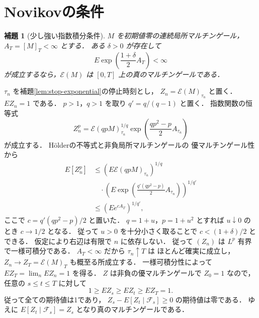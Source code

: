 \documentclass[a5paper,10pt,onecolumn]{jsarticle}
\makeatletter
\theoremstyle{mathnotetheorem}
\newtheorem{lemma}[theorem]{補題}
\renewcommand{\proofname}{証明}
\renewenvironment{proof}[1][\proofname]{%
  \par\pushQED{\qed}\normalfont\topsep4\p@\@plus2\p@\relax
  \trivlist\item[\hskip\labelsep\bfseries #1]\ignorespaces
}{\popQED\endtrivlist\@endpefalse}
\makeatother
\begin{document}
\section{Novikovの条件}

\begin{lemma}[少し強い指数積分条件]\label{lem:strong-nov}
$M$ を初期値零の連続局所マルチンゲール，
$A_T=[M]_T<\infty$ とする．
ある $\delta>0$ が存在して
\[
 E\exp\!\left(\frac{1+\delta}{2}A_T\right)<\infty
\]
が成立するなら，$\mathcal E(M)$ は
$[0,T]$ 上の真のマルチンゲールである．
\end{lemma}
\begin{proof}
$\tau_n$ を補題\ref{lem:stop-exponential}の停止時刻とし，
$Z_n=\mathcal E(M)_{\tau_n}$ と置く．
$EZ_n=1$ である．
$p>1$，$q>1$ を取り $q'=q/(q-1)$ と置く．
指数関数の恒等式
\[
 Z_n^p
 =\mathcal E(qpM)_{\tau_n}^{1/q}
  \exp\!\left(\frac{qp^2-p}{2}A_{\tau_n}\right)
\]
が成立する．
H\"olderの不等式と非負局所マルチンゲールの
優マルチンゲール性から
\begin{align*}
 E[Z_n^p]
 &\le
 (E\mathcal E(qpM)_{\tau_n})^{1/q}\\
 &\quad\cdot
 \left(E\exp\!\left(
  \frac{q'(qp^2-p)}{2}A_{\tau_n}\right)\right)^{1/q'}\\
 &\le
 \left(Ee^{cA_T}\right)^{1/q'},
\end{align*}
ここで
$c=q'(qp^2-p)/2$ と置いた．
$q=1+u$，$p=1+u^2$ とすれば
$u\downarrow0$ のとき $c\to1/2$ となる．
従って $u>0$ を十分小さく取ることで
$c<(1+\delta)/2$ とできる．
仮定により右辺は有限で $n$ に依存しない．
従って $(Z_n)$ は $L^p$ 有界で一様可積分である．
$A_T<\infty$ だから $\tau_n\uparrow T$ は
ほとんど確実に成立し，
$Z_n\to Z_T=\mathcal E(M)_T$ も概至る所成立する．
一様可積分性によって
$EZ_T=\lim_nEZ_n=1$ を得る．
$Z$ は非負の優マルチンゲールで $Z_0=1$ なので，
任意の $s\le t\le T$ に対して
\[
 1\ge EZ_s\ge EZ_t\ge EZ_T=1.
\]
従って全ての期待値は1であり，
$Z_s-E[Z_t\mid\mathcal F_s]\ge0$ の期待値は零である．
ゆえに $E[Z_t\mid\mathcal F_s]=Z_s$ となり真のマルチンゲールである．
\end{proof}
\end{document}
